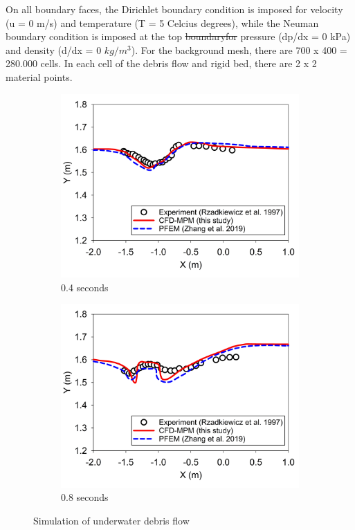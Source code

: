 \documentclass[preprint,12pt]{elsarticle}
\providecommand{\DIFadd}[1]{{\protect\color{blue}\uwave{#1}}} %
\providecommand{\DIFdel}[1]{{\protect\color{red}\sout{#1}}}                      %
\providecommand{\DIFaddbegin}{} %
\providecommand{\DIFaddend}{} %
\providecommand{\DIFdelbegin}{} %
\providecommand{\DIFdelend}{} %
\newcommand{\DIFscaledelfig}{0.5}
\newlength{\DIFdelgraphicswidth} %
\newlength{\DIFdelgraphicsheight} %
\newcommand{\DIFaddincludegraphics}[2][]{{\color{blue}\fbox{\DIFOincludegraphics[#1]{#2}}}} %
\newcommand{\DIFdelincludegraphics}[2][]{%
\sbox{\DIFdelgraphicsbox}{\DIFOincludegraphics[#1]{#2}}%
\settoboxwidth{\DIFdelgraphicswidth}{\DIFdelgraphicsbox} %
\settoboxtotalheight{\DIFdelgraphicsheight}{\DIFdelgraphicsbox} %
\scalebox{\DIFscaledelfig}{%
\parbox[b]{\DIFdelgraphicswidth}{\usebox{\DIFdelgraphicsbox}\\[-\baselineskip] \rule{\DIFdelgraphicswidth}{0em}}\llap{\resizebox{\DIFdelgraphicswidth}{\DIFdelgraphicsheight}{%
\setlength{\unitlength}{\DIFdelgraphicswidth}%
\begin{picture}(1,1)%
\thicklines\linethickness{2pt} %
{\color[rgb]{1,0,0}\put(0,0){\framebox(1,1){}}}%
{\color[rgb]{1,0,0}\put(0,0){\line( 1,1){1}}}%
{\color[rgb]{1,0,0}\put(0,1){\line(1,-1){1}}}%
\end{picture}%
}\hspace*{3pt}}} %
} %
\DeclareRobustCommand{\DIFaddbegin}{\DIFOaddbegin \let\includegraphics\DIFaddincludegraphics} %
\DeclareRobustCommand{\DIFaddend}{\DIFOaddend \let\includegraphics\DIFOincludegraphics} %
\DeclareRobustCommand{\DIFdelbegin}{\DIFOdelbegin \let\includegraphics\DIFdelincludegraphics} %
\DeclareRobustCommand{\DIFdelend}{\DIFOaddend \let\includegraphics\DIFOincludegraphics} %
\begin{document}
On all boundary faces, the Dirichlet boundary condition is imposed for velocity (u = 0 m/s) and temperature (T = 5 Celcius degrees), while the Neuman boundary condition is imposed at the top \DIFdelbegin \DIFdel{boundaryfor }\DIFdelend \DIFaddbegin \DIFadd{boundary for }\DIFaddend pressure (dp/dx = 0 kPa) and density (d\DIFaddbegin \DIFadd{$\rho$}\DIFaddend /dx = 0 $kg/m^3$). For the background mesh, there are 700 x 400 = 280.000 cells. In each cell of the debris flow and rigid bed, there are 2 x 2 material points. \\
%
%
\begin{figure}
\center
\begin{subfigure}[c]{0.5\linewidth}
\includegraphics[width=\linewidth]{0.4swater.jpg}
\caption{0.4 seconds}
\label{0.4swater}
\end{subfigure}\hfill    
\begin{subfigure}[d]{0.5\linewidth}
\includegraphics[width=\linewidth]{0.8swater.jpg}
\caption{0.8 seconds}
\label{0.8swater}
\end{subfigure}
\caption{Simulation of underwater debris flow}
\label{watersurface}
\end{figure}
\end{document}
